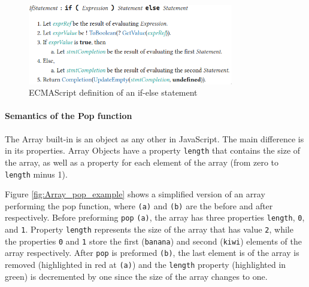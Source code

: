 \documentclass[runningheads]{llncs}
\begin{document}
\begin{figure}[ht]
    \centering
    \includegraphics[width=0.8\textwidth]{images/if_statement.png}
    \caption{ECMAScript definition of an if-else statement}
    \label{fig:If-Else_Statement}
\end{figure}

\paragraph{Semantics of the Pop function}
The Array built-in is an object as any other in JavaScript. The main difference is in its properties. Array Objects have a property \texttt{length} that contains the size of the array, as well as a property for each element of the array (from zero to \texttt{length} minus 1).

Figure \ref{fig:Array_pop_example} shows a simplified version of an array performing the pop function, where \texttt{(a)} and \texttt{(b)} are the before and after respectively.
Before preforming \texttt{pop} \texttt{(a)}, the array has three  properties \texttt{length}, \texttt{0}, and \texttt{1}. Property \texttt{length} represents the size of the array that has value \texttt{2}, while the properties \texttt{0} and \texttt{1} store the first (\texttt{banana}) and second (\texttt{kiwi}) elements of the array respectively.
After \texttt{pop} is preformed \texttt{(b)}, the last element is of the array is removed (highlighted in red at \texttt{(a)}) and the \texttt{length} property (highlighted in green) is decremented by one since the size of the array changes to one.
\end{document}
